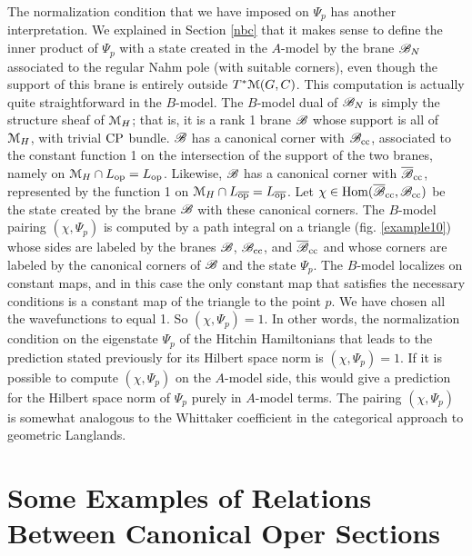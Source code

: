 \documentclass[11pt,a4paper]{article}
\begin{document}
The normalization condition that we have imposed on $\Psi_p$
has another interpretation.  We explained in Section \ref{nbc} that it makes sense to define the inner product of 
$\Psi_p$ with a state created in the $A$-model
by the brane ${\mathscr B}_N$ associated to the regular Nahm pole (with suitable corners), even though the support of this  brane is entirely outside $T^*{\mathcal M}(G,C)$.  This
computation is actually quite straightforward in the $B$-model.   The $B$-model dual of ${\mathscr B}_N$ is simply the structure sheaf of ${\mathcal M}_H$; that is, it is a rank
1 brane ${\mathscr B}$ whose support is all of ${\mathcal M}_H$, with trivial ${\mathrm{CP}}$ bundle.    ${\mathscr B}$ has a canonical  corner  with ${\mathscr B}_{\mathrm{cc}}$, associated to the constant function 1 on the intersection of the support
of the two branes, namely on ${\mathcal M}_H\cap L_{\mathrm{op}}=L_{\mathrm{op}}$.   Likewise, ${\mathscr B}$ has a  canonical corner with $\overline{{\mathscr B}}_{\mathrm{cc}}$, represented by the function 1 on
${\mathcal M}_H\cap L_{{\overline{\mathrm{op}}}}=L_{{\overline{\mathrm{op}}}}$.   Let $\chi\in {\mathrm{Hom}}(\overline{{\mathscr B}}_{\mathrm{cc}},{\mathscr B}_{\mathrm{cc}})$ be
the state created by the brane ${\mathscr B}$ with these canonical corners.    The $B$-model pairing $(\chi,\Psi_p)$ is computed by a  path integral
on a triangle (fig. \ref{example10}) whose sides are labeled by the branes ${\mathscr B}$, ${\mathscr B}_{\mathrm{cc}}$, and $\overline{{\mathscr B}}_{{\mathrm{cc}}}$ and whose corners are labeled by the canonical corners of ${\mathscr B}$
and the state $\Psi_p$.    The $B$-model localizes on constant maps, and in this case the only constant map that satisfies the necessary conditions is
a constant map of the triangle to the point $p$.   We have chosen all the wavefunctions to equal 1.   So $(\chi,\Psi_p)=1$.   In other words, the normalization
condition on the eigenstate $\Psi_p$ of the Hitchin Hamiltonians that leads to the prediction stated previously for its Hilbert space norm is $(\chi,\Psi_p)=1$.    
If it is possible to compute $(\chi,\Psi_p)$ on the $A$-model side, this would give a prediction for the Hilbert space norm of $\Psi_p$ purely
in $A$-model terms.  The pairing $(\chi,\Psi_p)$ is somewhat analogous to the Whittaker coefficient in the categorical approach to geometric Langlands.

\section{Some Examples of Relations Between Canonical Oper Sections}\label{somex}
\end{document}
